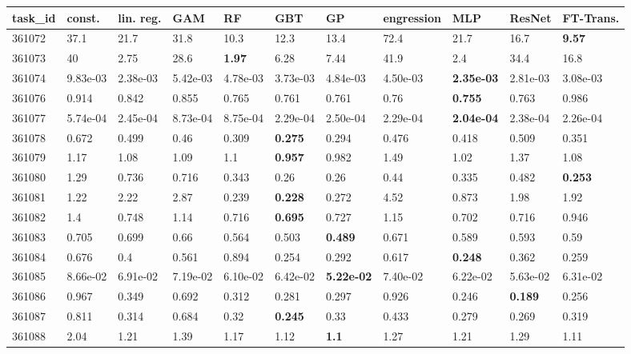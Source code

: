 \begin{table}[ht!]
\centering
\begingroup\footnotesize
\begin{tabular}{lllllllllll}
  \hline
\hline
task\_id & const. & lin. reg. & GAM & RF & GBT & GP & engression & MLP & ResNet & FT-Trans. \\ 
  \hline
361072 & 37.1 & 21.7 & 31.8 & 10.3 & 12.3 & 13.4 & 72.4 & 21.7 & 16.7 & \textbf{9.57} \\ 
  361073 & 40 & 2.75 & 28.6 & \textbf{1.97} & 6.28 & 7.44 & 41.9 & 2.4 & 34.4 & 16.8 \\ 
  361074 & 9.83e-03 & 2.38e-03 & 5.42e-03 & 4.78e-03 & 3.73e-03 & 4.84e-03 & 4.50e-03 & \textbf{2.35e-03} & 2.81e-03 & 3.08e-03 \\ 
  361076 & 0.914 & 0.842 & 0.855 & 0.765 & 0.761 & 0.761 & 0.76 & \textbf{0.755} & 0.763 & 0.986 \\ 
  361077 & 5.74e-04 & 2.45e-04 & 8.73e-04 & 8.75e-04 & 2.29e-04 & 2.50e-04 & 2.29e-04 & \textbf{2.04e-04} & 2.38e-04 & 2.26e-04 \\ 
  361078 & 0.672 & 0.499 & 0.46 & 0.309 & \textbf{0.275} & 0.294 & 0.476 & 0.418 & 0.509 & 0.351 \\ 
  361079 & 1.17 & 1.08 & 1.09 & 1.1 & \textbf{0.957} & 0.982 & 1.49 & 1.02 & 1.37 & 1.08 \\ 
  361080 & 1.29 & 0.736 & 0.716 & 0.343 & 0.26 & 0.26 & 0.44 & 0.335 & 0.482 & \textbf{0.253} \\ 
  361081 & 1.22 & 2.22 & 2.87 & 0.239 & \textbf{0.228} & 0.272 & 4.52 & 0.873 & 1.98 & 1.92 \\ 
  361082 & 1.4 & 0.748 & 1.14 & 0.716 & \textbf{0.695} & 0.727 & 1.15 & 0.702 & 0.716 & 0.946 \\ 
  361083 & 0.705 & 0.699 & 0.66 & 0.564 & 0.503 & \textbf{0.489} & 0.671 & 0.589 & 0.593 & 0.59 \\ 
  361084 & 0.676 & 0.4 & 0.561 & 0.894 & 0.254 & 0.292 & 0.617 & \textbf{0.248} & 0.362 & 0.259 \\ 
  361085 & 8.66e-02 & 6.91e-02 & 7.19e-02 & 6.10e-02 & 6.42e-02 & \textbf{5.22e-02} & 7.40e-02 & 6.22e-02 & 5.63e-02 & 6.31e-02 \\ 
  361086 & 0.967 & 0.349 & 0.692 & 0.312 & 0.281 & 0.297 & 0.926 & 0.246 & \textbf{0.189} & 0.256 \\ 
  361087 & 0.811 & 0.314 & 0.684 & 0.32 & \textbf{0.245} & 0.33 & 0.433 & 0.279 & 0.269 & 0.319 \\ 
  361088 & 2.04 & 1.21 & 1.39 & 1.17 & 1.12 & \textbf{1.1} & 1.27 & 1.21 & 1.29 & 1.11 \\ 

\end{tabular}
\end{table}

